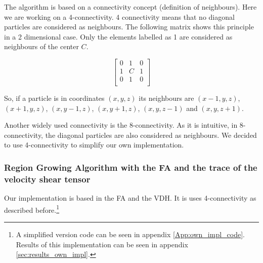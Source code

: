 \documentclass[12pt]{article}
\begin{document}
\begin{par}
The algorithm is based on a connectivity concept (definition of
neighbours). Here we are working on a 4-connectivity. 4
connectivity means that no diagonal particles are considered as
neighbours. The following matrix shows this principle in a 2
dimensional case. Only the elements labelled as 1 are considered as
neighbours of the center $C$.
\end{par}

\[ 
\begin{bmatrix} 
    0 & 1 & 0 \\
    1 & C & 1 \\
    0 & 1 & 0\\
\end{bmatrix} 
\]

\begin{par}
So, if a particle is in coordinates $(x,y,z)$ its neighbours are
$(x-1,y,z)$, $(x+1,y,z)$, $(x,y-1,z)$, $(x,y+1,z)$, $(x,y,z-1)$
and $(x,y,z+1)$.
\end{par}

\begin{par}
Another widely used connectivity is the 8-connectivity. As it is
intuitive, in 8-connectivity, the diagonal particles are also
considered as neighbours. We decided to use 4-connectivity to
simplify our own implementation.
\end{par}




\subsubsection{Region Growing Algorithm with the FA and the trace of the velocity shear tensor}\label{sec:own_impl_descr}
Our implementation is based in the FA and the VDH. It is uses 4-connectivity as described before.\footnote{
A simplified version code can be seen in appendix \ref{App:own_impl_code}. Results of this
  implementation can be seen in appendix
   \ref{sec:results_own_impl}.
}
\end{document}
